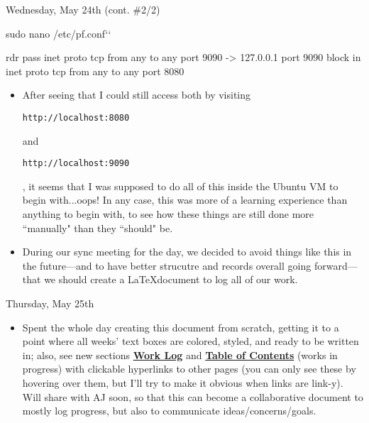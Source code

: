 \documentclass[11pt]{article}
\newcommand\codebox[1]{
    \noindent\hspace{-0.25em}\begin{tcolorbox}[on line, hbox, colback = codeblack, colframe = codeborder, coltext = white, boxrule = 1.5pt, left = 2pt, right = 2pt, top = 0.5pt, bottom = 0.5pt]
    \small\texttt{#1}\normalsize
    \end{tcolorbox}
}
\newcommand{\StartConsole}{\gdef\MyUbuntuPrompt{}}
\begin{document}
\begin{redbox}{Wednesday, May 24th (cont. \#2/2)}
    \begin{ubuntu}
 sudo nano /etc/pf.conf`\StartConsole`

rdr pass inet proto tcp from any to any port 9090 -> 127.0.0.1 port 9090
block in inet proto tcp from any to any port 8080
    \end{ubuntu}
\begin{itemize}
    \begin{itemize}
        \item After saving changes and exiting, I enabled \codebox{pf} by running \codebox{sudo pfctl -e}.
    \end{itemize}
    \item After seeing that I could still access both by visiting \codebox{http://localhost:8080} and \codebox{http://localhost:9090}, it seems that I was supposed to do all of this inside the Ubuntu VM to begin with...oops! In any case, this was more of a learning experience than anything to begin with, to see how these things are still done more ``manually" than they ``should" be. 
    \item During our sync meeting for the day, we decided to avoid things like this in the future---and to have better strucutre and records overall going forward---that we should create a \LaTeX document to log all of our work.
\end{itemize}
\end{redbox}

\begin{center}
\vspace{-0.25em}
\vspace{-0.4em}
\end{center}

\begin{redbox}{Thursday, May 25th}
\begin{itemize}
    \item Spent the whole day creating this document from scratch, getting it to a point where all weeks' text boxes are colored, styled, and ready to be written in; also, see new sections \hyperlink{page.1}{\textbf{Work Log}} and \hyperlink{page.1}{\textbf{Table of Contents}} (works in progress) with clickable hyperlinks to other pages (you can only see these by hovering over them, but I'll try to make it obvious when links are link-y). Will share with AJ soon, so that this can become a collaborative document to mostly log progress, but also to communicate ideas/concerns/goals.
\end{itemize}
\end{redbox}
\end{document}
